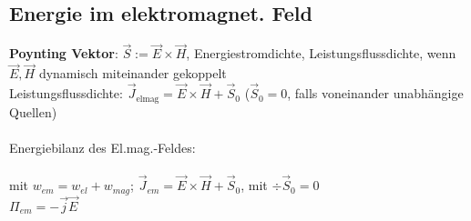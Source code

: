 \subsection{Energie im elektromagnet. Feld}
\textbf{Poynting Vektor}: $\vec S := \vec E \times \vec H$, Energiestromdichte, Leistungsflussdichte, wenn $\vec E, \vec H$ dynamisch miteinander gekoppelt\\
Leistungsflussdichte: $\vec J_{\text{elmag}} = \vec E \times \vec H + \vec S_0$ ($\vec S_0 = 0$, falls voneinander unabhängige Quellen)\\
\\
Energiebilanz des El.mag.-Feldes:\\
\\
mit $w_{em} = w_{el} + w_{mag}$; $\vec J_{em} = \vec E \times \vec H + \vec S_0$, mit $\div \vec S_0 = 0$\\
$\Pi_{em} = -\vec j  \vec E$\\
